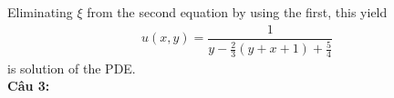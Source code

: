 \documentclass{article}
\newcommand{\dps}{\displaystyle}
\newcommand{\f}[2]{\dfrac{#1}{#2}}
\newcommand{\at}[2]{\bigg\rvert_{#1}^{#2} }
\begin{document}
Eliminating $\xi$ from the second equation by using the first, this yield
\begin{align*}
	u(x,y) = \f{1}{y - \frac{2}{3}\left( y + x + 1 \right) + \frac{5}{4}}
\end{align*}
is solution of the PDE.\\
\textbf{Câu 3:}
\end{document}
